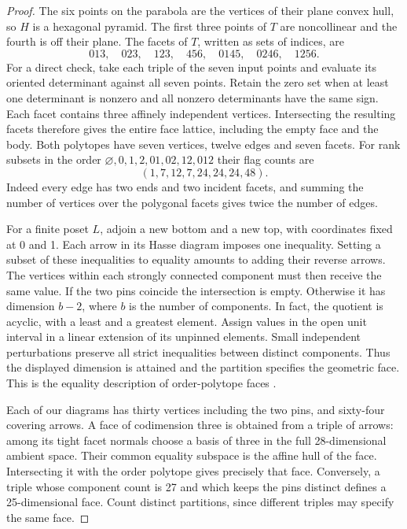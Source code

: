\documentclass[11pt]{article}
\begin{document}
\begin{proof}
The six points on the parabola are the vertices of their plane
convex hull, so \(H\) is a hexagonal pyramid. The first three
points of \(T\) are noncollinear and the fourth is off their plane.
The facets of \(T\), written as sets of indices, are
\[
 013,\quad 023,\quad 123,\quad 456,\quad
 0145,\quad 0246,\quad 1256.
\]
For a direct check, take each triple of the seven input points and
evaluate its oriented determinant against all seven points. Retain
the zero set when at least one determinant is nonzero and all
nonzero determinants have the same sign. Each facet contains three
affinely independent vertices. Intersecting the resulting facets
therefore gives the entire face lattice, including the empty face
and the body. Both polytopes have seven vertices, twelve edges and
seven facets. For rank subsets in the order
\(\varnothing,0,1,2,01,02,12,012\) their flag counts are
\[
                  (1,7,12,7,24,24,24,48).
\]
Indeed every edge has two ends and two incident facets, and summing
the number of vertices over the polygonal facets gives twice the
number of edges.

For a finite poset \(L\), adjoin a new bottom and a new top, with
coordinates fixed at 0 and 1. Each arrow in its Hasse diagram
imposes one inequality. Setting a subset of these inequalities
to equality amounts to adding their reverse arrows. The vertices
within each strongly connected component must then receive the
same value. If the two pins coincide the intersection is empty.
Otherwise it has dimension \(b-2\), where \(b\) is the number of
components. In fact, the quotient is acyclic, with a least and a
greatest element. Assign values in the open unit interval in a
linear extension of its unpinned elements. Small independent
perturbations preserve all strict inequalities between distinct
components. Thus the displayed dimension is attained and the
partition specifies the geometric face. This is the equality
description of order-polytope faces \cite{Stanley}.

Each of our diagrams has thirty vertices including the two pins,
and sixty-four covering arrows. A face of codimension three is
obtained from a triple of arrows: among its tight facet normals
choose a basis of three in the full 28-dimensional ambient space.
Their common equality subspace is the affine hull of the face.
Intersecting it with the order polytope gives precisely that face.
Conversely, a triple whose component count is 27 and which keeps
the pins distinct defines a 25-dimensional face. Count distinct
partitions, since different triples may specify the same face.


\end{proof}
\end{document}

